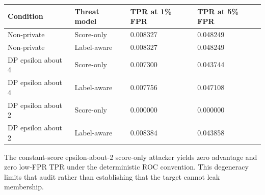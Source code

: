 \documentclass[11pt,a4paper]{article}
\begin{document}
\begin{longtable}[]{@{}llll@{}}
\toprule\noalign{}
Condition & Threat model & TPR at 1\% FPR & TPR at 5\% FPR \\
\midrule\noalign{}
\endhead
\bottomrule\noalign{}
\endlastfoot
Non-private & Score-only & 0.008327 & 0.048249 \\
Non-private & Label-aware & 0.008327 & 0.048249 \\
DP epsilon about 4 & Score-only & 0.007300 & 0.043744 \\
DP epsilon about 4 & Label-aware & 0.007756 & 0.047108 \\
DP epsilon about 2 & Score-only & 0.000000 & 0.000000 \\
DP epsilon about 2 & Label-aware & 0.008384 & 0.043858 \\
\end{longtable}

The constant-score epsilon-about-2 score-only attacker yields zero
advantage and zero low-FPR TPR under the deterministic ROC convention.
This degeneracy limits that audit rather than establishing that the
target cannot leak membership.


\end{document}
